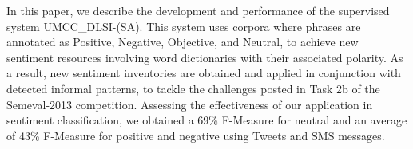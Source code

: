 In this paper, we describe the development and performance of the supervised system UMCC\_DLSI-(SA). This system uses corpora where phrases are annotated as
 Positive, Negative, Objective, and Neutral, to achieve new sentiment resources
 involving word dictionaries with their associated polarity. As a result, new
 sentiment inventories are obtained and applied in conjunction with detected
 informal patterns, to tackle the challenges posted in Task 2b of the
 Semeval-2013 competition. Assessing the effectiveness of our application in
 sentiment classification, we obtained a 69\% F-Measure for neutral and an
 average of 43\% F-Measure for positive and negative using Tweets and SMS
 messages.

